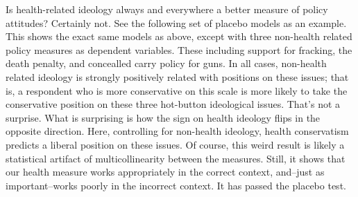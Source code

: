 \documentclass[
  oneside]{book}
\begin{document}
Is health-related ideology always and everywhere a better measure of policy attitudes? Certainly not. See the following set of placebo models as an example. This shows the exact same models as above, except with three non-health related policy measures as dependent variables. These including support for fracking, the death penalty, and concealled carry policy for guns. In all cases, non-health related ideology is strongly positively related with positions on these issues; that is, a respondent who is more conservative on this scale is more likely to take the conservative position on these three hot-button ideological issues. That's not a surprise. What is surprising is how the sign on health ideology flips in the opposite direction. Here, controlling for non-health ideology, health conservatism predicts a liberal position on these issues. Of course, this weird result is likely a statistical artifact of multicollinearity between the measures. Still, it shows that our health measure works appropriately in the correct context, and--just as important--works poorly in the incorrect context. It has passed the placebo test.
\end{document}
